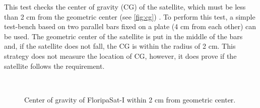 This test checks the center of gravity (CG) of the satellite, which must be less than 2 cm from the geometric center (see \autoref{fig:cg}) \cite{cds}. To perform this test, a simple test-bench based on two parallel bars fixed on a plate (4 cm from each other) can be used. The geometric center of the satellite is put in the middle of the bars and, if the satellite does not fall, the CG is within the radius of 2 cm. This strategy does not measure the location of CG, however, it does prove if the satellite follows the requirement.

\begin{figure}[!htb]
    \begin{center}
        ~
        ~
        \caption{Center of gravity of FloripaSat-I within 2 cm from geometric center.}
        \label{fig:cg}
    \end{center}
\end{figure}

